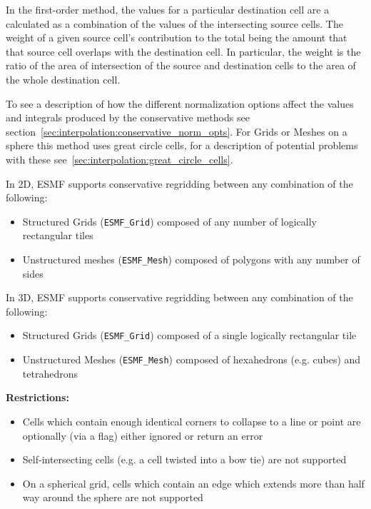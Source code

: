  In the first-order method, the values for a particular destination cell are a calculated as a combination of the values of the intersecting 
 source cells. The weight of a given source cell's contribution 
 to the total being the amount that that source cell overlaps with the destination cell. 
 In particular, the weight is the ratio of the area of intersection of the source and destination cells to the area of the whole destination cell. 

 To see a description of how the different normalization options affect the values and integrals produced by the conservative methods see section~\ref{sec:interpolation:conservative_norm_opts}. For Grids or Meshes on a sphere this method uses great circle cells, for a description of potential problems with these see~\ref{sec:interpolation:great_circle_cells}.

\smallskip

 In 2D, ESMF supports conservative regridding between any combination of the following:
 \begin{itemize}
 \item Structured Grids ({\tt ESMF\_Grid}) composed of any number of logically rectangular tiles
 \item Unstructured meshes ({\tt ESMF\_Mesh}) composed of polygons with any number of sides
 \end{itemize}

\smallskip

 In 3D, ESMF supports conservative regridding between any combination of the following:
 \begin{itemize}
 \item Structured Grids ({\tt ESMF\_Grid}) composed of a single logically rectangular tile
 \item Unstructured Meshes ({\tt ESMF\_Mesh}) composed of hexahedrons (e.g. cubes) and tetrahedrons
 \end{itemize}

\smallskip

{\bf Restrictions:}
 \begin{itemize}
 \item Cells which contain enough identical corners to collapse to a line or point are optionally (via a flag) either ignored or return an error
 \item Self-intersecting cells (e.g. a cell twisted into a bow tie) are not supported
 \item On a spherical grid, cells which contain an edge which extends more than half way around the sphere are not supported 
 \end{itemize}


